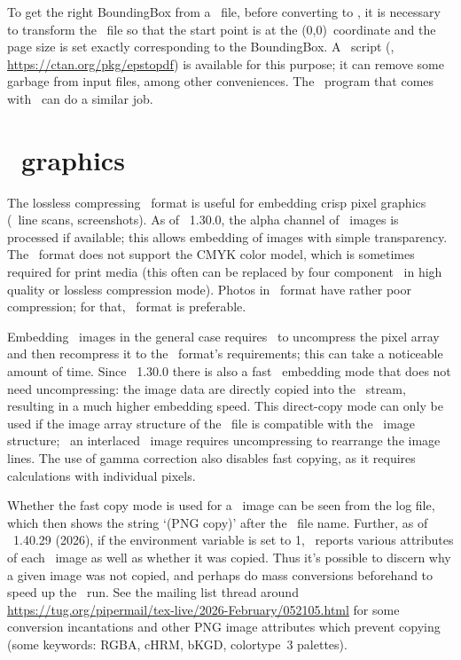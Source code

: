\documentclass{pdftexmanual}
\begin{document}
To get the right BoundingBox from a \EPS\ file, before converting to
\PDF, it is necessary to transform the \EPS\ file so that the start
point is at the (0,0)~coordinate and the page size is set exactly
corresponding to the BoundingBox. A \PERL\ script (\EPSTOPDF,
\url{https://ctan.org/pkg/epstopdf}) is available for this purpose; it
can remove some garbage from input files, among other conveniences. The
\PSTOPDF\ program that comes with \GHOSTSCRIPT\ can do a similar job.

\section{\PNG\ graphics}

The lossless compressing \PNG\ format is useful for embedding crisp
pixel graphics (\eg\ line scans, screenshots). As of \PDFTEX\ 1.30.0,
the alpha channel of \PNG\ images is processed if available; this allows
embedding of images with simple transparency. The \PNG\ format does not
support the CMYK color model, which is sometimes required for print
media (this often can be replaced by four component \JPEG\ in high
quality or lossless compression mode). Photos in \PNG\ format have
rather poor compression; for that, \JPEG\ format is preferable.

Embedding \PNG\ images in the general case requires \PDFTEX\ to
uncompress the pixel array and then re\hyph compress it to the \PDF\
format's requirements; this can take a noticeable amount of time. Since
\PDFTEX\ 1.30.0 there is also a fast \PNG\ embedding mode that does not
need uncompressing: the image data are directly copied into the \PDF\
stream, resulting in a much higher embedding speed. This direct-copy
mode can only be used if the image array structure of the \PNG\ file is
compatible with the \PDF\ image structure; \eg\ an interlaced \PNG\
image requires uncompressing to rearrange the image lines. The use of
gamma correction also disables fast copying, as it requires calculations
with individual pixels.

Whether the fast copy mode is used for a \PNG\ image can be seen from
the log file, which then shows the string `(PNG copy)' after the \PNG\
file name. Further, as of \PDFTEX\ 1.40.29 (2026), if the environment
variable  is set to 1, \PDFTEX\ reports
various attributes of each \PNG\ image as well as whether it was copied.
Thus it's possible to discern why a given image was not copied, and
perhaps do mass conversions beforehand to speed up the \PDFTEX\ run. See
the mailing list thread around
\url{https://tug.org/pipermail/tex-live/2026-February/052105.html} for
some conversion incantations and other PNG image attributes which
prevent copying (some keywords: RGBA, cHRM, bKGD, colortype~3 palettes).
\end{document}
